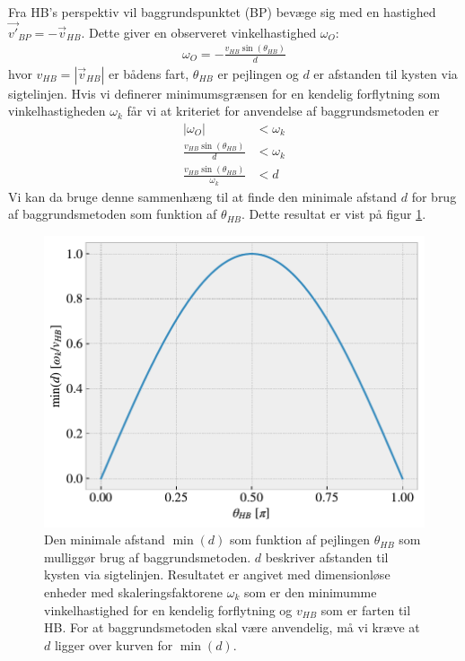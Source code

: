 \documentclass[%
 reprint,
nofootinbib,
aps,
]{revtex4-1}
\begin{document}
 Fra HB's perspektiv vil baggrundspunktet (BP) bevæge sig med en hastighed $\vec{v'}_{BP} = - \vec{v}_{HB}$. Dette giver en observeret vinkelhastighed $\omega_O$:
 \begin{align*}
   \omega_O = -\frac{v_{HB}\sin{(\theta_{HB})}}{d}
 \end{align*}
 hvor $v_{HB} = |\vec{v}_{HB}|$ er bådens fart, $\theta_{HB}$ er pejlingen og $d$ er afstanden til kysten via sigtelinjen. Hvis vi definerer minimumsgrænsen for en kendelig forflytning som vinkelhastigheden $\omega_k$ får vi at kriteriet for anvendelse af baggrundsmetoden er
 \begin{align}
   |\omega_O| &< \omega_k \nonumber \\
   \frac{v_{HB}\sin{(\theta_{HB})}}{d} &< \omega_k \nonumber \\
   \frac{v_{HB}\sin{(\theta_{HB})}}{\omega_k} &< d
   \label{eq:limit}
 \end{align}
Vi kan da bruge denne sammenhæng til at finde den minimale afstand $d$ for brug af baggrundsmetoden som funktion af $\theta_{HB}$. Dette resultat er vist på figur \ref{fig:limit_dimensionless}.
 \begin{figure}[H]
   \includegraphics[width=\linewidth]{figures/limit_dimensionless.pdf}
   \caption{Den minimale afstand $\min{(d)}$ som funktion af pejlingen $\theta_{HB}$ som mulliggør brug af baggrundsmetoden. $d$ beskriver afstanden til kysten via sigtelinjen. Resultatet er angivet med dimensionløse enheder med skaleringsfaktorene $\omega_k$ som er den minimumme vinkelhastighed for en kendelig forflytning og $v_{HB}$ som er farten til HB. For at baggrundsmetoden skal være anvendelig, må vi kræve at $d$ ligger over kurven for $\min{(d)}$.}
   \label{fig:limit_dimensionless}
 \end{figure}
\end{document}

